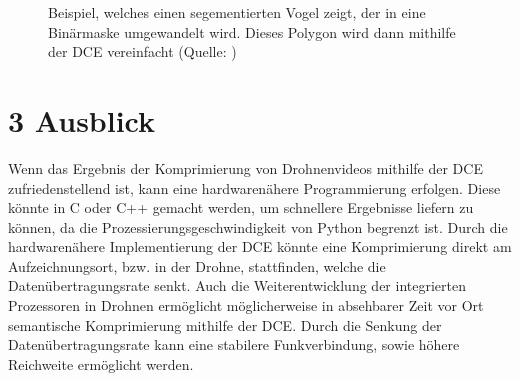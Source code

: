 \documentclass[a4paper,11pt,pdftex, parskip]{scrreprt}
\begin{document}
{\begin{figure}[ht]
    \caption[Beispielablauf der Segmentierung und DCE aus \citet{Dorr2017}]{Beispiel, welches einen segementierten Vogel zeigt, der in eine Binärmaske umgewandelt wird. Dieses Polygon wird dann mithilfe der DCE vereinfacht (Quelle: \citep{Dorr2017})}
    \label{Bsp_Dorr}
\end{figure}
}


    
    






\section*{3 Ausblick}
Wenn das Ergebnis der Komprimierung von Drohnenvideos mithilfe der DCE zufriedenstellend ist, kann eine hardwarenähere Programmierung erfolgen. Diese könnte in C oder C++ gemacht werden, um schnellere Ergebnisse liefern zu können, da die Prozessierungsgeschwindigkeit von Python begrenzt ist.\newline
Durch die hardwarenähere Implementierung der DCE könnte eine Komprimierung direkt am Aufzeichnungsort, bzw. in der Drohne, stattfinden, welche die Datenübertragungsrate senkt. Auch die Weiterentwicklung der integrierten Prozessoren in Drohnen ermöglicht möglicherweise in absehbarer Zeit vor Ort semantische Komprimierung mithilfe der DCE. Durch die Senkung der Datenübertragungsrate kann eine stabilere Funkverbindung, sowie höhere Reichweite ermöglicht werden.



\appendix




\setcounter{page}{1}

\listoffigures
\end{document}
